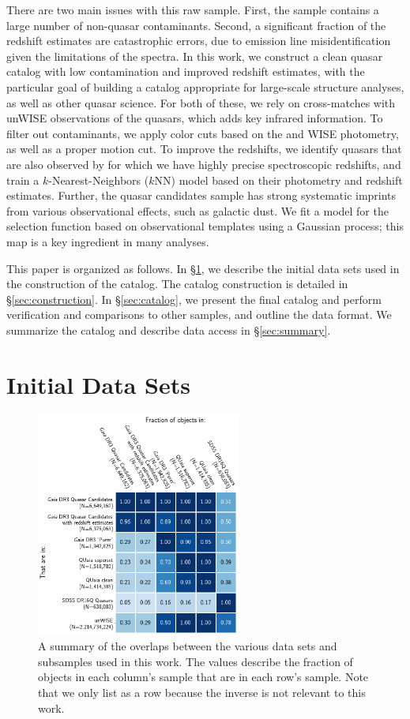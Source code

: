 There are two main issues with this raw \Gaia sample.
First, the sample contains a large number of non-quasar contaminants.
Second, a significant fraction of the redshift estimates are catastrophic errors, due to emission line misidentification given the limitations of the spectra.
In this work, we construct a clean quasar catalog with low contamination and improved redshift estimates, with the particular goal of building a catalog appropriate for large-scale structure analyses, as well as other quasar science.
For both of these, we rely on cross-matches with unWISE observations of the quasars, which adds key infrared information.
To filter out contaminants, we apply color cuts based on the \Gaia and WISE photometry, as well as a proper motion cut.
To improve the redshifts, we identify quasars that are also observed by \SDSS for which we have highly precise spectroscopic redshifts, and train a $k$-Nearest-Neighbors ($k$NN) model based on their photometry and \Gaia redshift estimates.
Further, the \Gaia quasar candidates sample has strong systematic imprints from various observational effects, such as galactic dust.
We fit a model for the selection function based on observational templates using a Gaussian process; this map is a key ingredient in many analyses.

This paper is organized as follows.
In \S\ref{sec:data}, we describe the initial data sets used in the construction of the catalog.
The catalog construction is detailed in \S\ref{sec:construction}.
In \S\ref{sec:catalog}, we present the final catalog and perform verification and comparisons to other samples, and outline the data format.
We summarize the catalog and describe data access in \S\ref{sec:summary}.

\section{Initial Data Sets}
\label{sec:data}

\begin{figure}
    \centering
    \includegraphics[width=0.6\textwidth]{frac_matrix.png}
    \caption{A summary of the overlaps between the various data sets and subsamples used in this work. The values describe the fraction of objects in each column's sample that are in each row's sample. Note that we only list \unWISE as a row because the inverse is not relevant to this work.}
    \label{fig:frac_matrix}
\end{figure}

